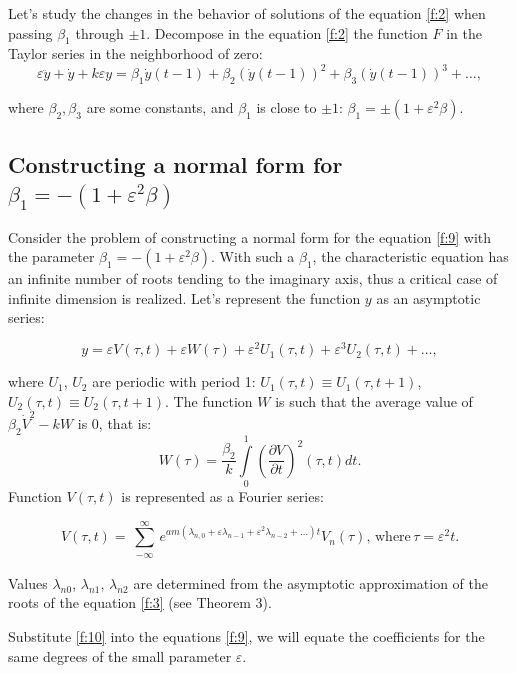 \documentclass[12pt]{article} %
\newcommand{\eps}{\varepsilon}
\begin{document}
Let's study the changes in the behavior of solutions of the equation \eqref{f:2} when passing $\beta_1$ through $\pm1$. Decompose in the equation \eqref{f:2} the function \(F\) in the Taylor series in the neighborhood of zero:
\begin{equation}
\eps\ddot{y}+\dot{y}+k\eps y=\beta_1\dot{y}(t-1)+\beta_2(\dot{y}(t-1))^2+\beta_3(\dot{y}(t-1))^3+\ldots,
\label{f:9}
\end{equation}

\noindent where \(\beta_2,\beta_3\) are some constants, and $\beta_1$ is close to $\pm1$: $\beta_1=\pm(1+\eps^2\beta)$.

\subsection{Constructing a normal form for $\beta_1=-(1+\eps^2\beta)$}

Consider the problem of constructing a normal form for the equation \eqref{f:9} with the parameter \(\beta_1=-(1+\eps^2\beta)\). With such a \(\beta_1\), the characteristic equation has an infinite number of roots tending to the imaginary axis, thus a critical case of infinite dimension is realized. Let's represent the function \(y\) as an asymptotic series:

\begin{equation}
y=\eps V(\tau,t)+\eps W(\tau)+\eps^2U_1(\tau,t)+\eps^3U_2(\tau,t)+\ldots,
\label{f:10}
\end{equation}

\noindent where \(U_1\), \(U_2\) are periodic with period 1: \(U_1(\tau,t)\equiv U_1(\tau,t+1)\), \(U_2(\tau,t)\equiv U_2(\tau,t+1)\). The function \(W\) is such that the average value of \(\beta_2\dot{V}^2-kW\) is 0, that is:
\[
W(\tau)=\frac{\beta_2}{k}\int\limits_0^1\left(\displaystyle\frac{\partial V}{\partial t}\right)^2(\tau,t)dt.
\]
\noindent Function \(V(\tau,t)\) is represented as a Fourier series:

\[
V(\tau,t)=\sum\limits_{\substack{ -\infty }}^\infty e^{am(\lambda_{n, 0}+ \varepsilon\lambda_{n-1}+\varepsilon^{2}\lambda_{n-2}+\ldots)t}V_n(\tau),\,\text{where}\,
\tau=\eps^2t.
\]

\noindent Values \(\lambda_{n 0}\), \(\lambda_{n 1}\), \(\lambda_{n 2}\) are determined from the asymptotic approximation of the roots of the equation \eqref{f:3} (see Theorem 3).

Substitute \eqref{f:10} into the equations \eqref{f:9}, we will equate the coefficients for the same degrees of the small parameter \(\eps\).
\end{document}
